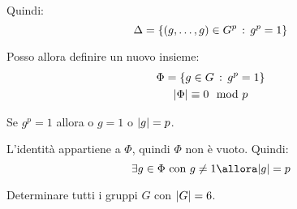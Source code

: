 \begin{dimostrazione}
    Quindi:
    \begin{equation*}
        \Delta = \{(g, \dots, g) \in G^p \,:\, g^p = 1\}
    \end{equation*}

    Posso allora definire un nuovo insieme:
    \begin{gather*}
        \Phi = \{g \in G \,:\, g^p = 1\} \\
        \lvert \Phi \rvert \equiv 0 \mod p
    \end{gather*}

    Se $g^p = 1$ allora o $g = 1$ o $\lvert g \rvert = p$.

    L'identità appartiene a $\Phi$, quindi $\Phi$ non è vuoto.
    Quindi:
    \begin{equation*}
        \exists g \in \Phi \text{ con } g \ne 1 \allora \ordine{g} = p
    \end{equation*}

\end{dimostrazione}

\begin{esercizio}
    Determinare tutti i gruppi $G$ con $\lvert G \rvert = 6$.
\end{esercizio}

